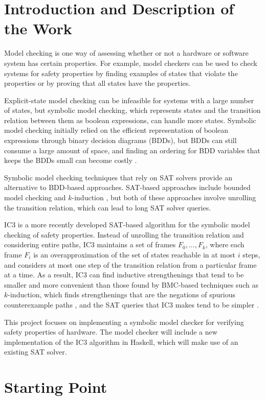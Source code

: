 \documentclass[12pt,a4paper,twoside]{article}
\begin{document}
\section*{Introduction and Description of the Work}
Model checking is one way of assessing whether or not a hardware or
software system has certain properties. For example, model checkers can be
used to check systems for safety properties by finding examples of states
that violate the properties or by proving that all states have the
properties.

Explicit-state model checking can be infeasible for systems with a large
number of states, but symbolic model checking, which represents
states and the transition relation between them as boolean expressions,
can handle more states. Symbolic model checking initially relied on the
efficient representation of boolean expressions through binary decision
diagrams (BDDs), but BDDs can still consume a large amount of space, and
finding an ordering for BDD variables that keeps the BDDs small can become
costly \cite{biere99}.

Symbolic model checking techniques that rely on SAT solvers provide an
alternative to BDD-based approaches. SAT-based approaches include
bounded model checking \cite{biere99} and $k$-induction \cite{demoura03},
but both of these approaches involve unrolling the transition relation,
which can lead to long SAT solver queries.

IC3 \cite{bradley11} is a more recently developed SAT-based algorithm for
the symbolic model checking of safety properties. Instead of unrolling the
transition relation and considering entire paths, IC3 maintains a set of
frames $F_0,...,F_k$, where each frame $F_i$ is an overapproximation of
the set of states reachable in at most $i$ steps, and considers at most one
step of the transition relation from a particular frame at a time.
As a result, IC3 can find inductive strengthenings that tend
to be smaller and more convenient than those found by BMC-based
techniques such as $k$-induction, which finds strengthenings that are the
negations of spurious counterexample paths \cite{demoura03}, and the SAT
queries that IC3 makes tend to be simpler \cite{bradley12}.

This project focuses on implementing a symbolic model checker for verifying
safety properties of hardware. The model checker will include a new
implementation of the IC3 algorithm in Haskell, which will make use of an
existing SAT solver.

\section*{Starting Point}
\end{document}
